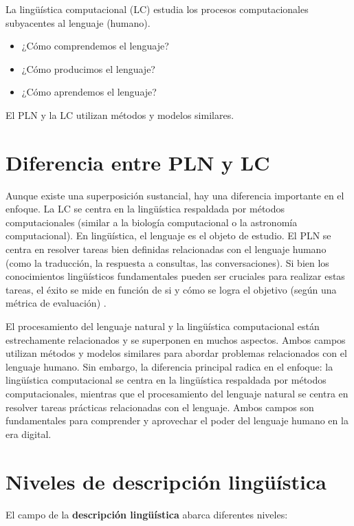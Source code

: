 \documentclass{book}
\begin{document}
La lingüística computacional (LC) estudia los procesos computacionales subyacentes al lenguaje (humano).

\begin{itemize}
  \item ¿Cómo comprendemos el lenguaje?
  \item ¿Cómo producimos el lenguaje?
  \item ¿Cómo aprendemos el lenguaje?
\end{itemize}

El PLN y la LC utilizan métodos y modelos similares.

\section{Diferencia entre PLN y LC}

Aunque existe una superposición sustancial, hay una diferencia importante en el enfoque. La LC se centra en la lingüística respaldada por métodos computacionales (similar a la biología computacional o la astronomía computacional). En lingüística, el lenguaje es el objeto de estudio. El PLN se centra en resolver tareas bien definidas relacionadas con el lenguaje humano (como la traducción, la respuesta a consultas, las conversaciones). Si bien los conocimientos lingüísticos fundamentales pueden ser cruciales para realizar estas tareas, el éxito se mide en función de si y cómo se logra el objetivo (según una métrica de evaluación) \cite{jacobbook}.



El procesamiento del lenguaje natural y la lingüística computacional están estrechamente relacionados y se superponen en muchos aspectos. Ambos campos utilizan métodos y modelos similares para abordar problemas relacionados con el lenguaje humano. Sin embargo, la diferencia principal radica en el enfoque: la lingüística computacional se centra en la lingüística respaldada por métodos computacionales, mientras que el procesamiento del lenguaje natural se centra en resolver tareas prácticas relacionadas con el lenguaje. Ambos campos son fundamentales para comprender y aprovechar el poder del lenguaje humano en la era digital.


\section{Niveles de descripción lingüística}

El campo de la \textbf{descripción lingüística} abarca diferentes niveles:
\end{document}
